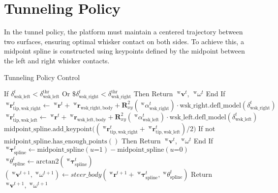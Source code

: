 \section{Tunneling Policy}

In the tunnel policy, the platform must maintain a centered trajectory between two surfaces, ensuring optimal whisker contact on both sides.
To achieve this, a midpoint spline is constructed using keypoints defined by the midpoint between the left and right whisker contacts.

\begin{algorithm}
    \caption{Tunneling Policy Control}
    \label{alg:tunneling_policy}
    \begin{algorithmic}
        \State If \(\delta_{\mathrm{wsk\_left}}^{t} < \delta_{\mathrm{wsk\_left}}^{\mathrm{thr}}\) Or \(\$\delta_{\mathrm{wsk\_right}}^{t} < \delta_{\mathrm{wsk\_right}}^{\mathrm{thr}}\) Then
        \State \quad Return \(\;^{\mathrm{w}}\boldsymbol{v}^{t}\), \(\;^{\mathrm{w}}\omega^{t}\)
        \State End If
        \State
        \State \(\;^{\mathrm{w}}\boldsymbol{r}_{\mathrm{tip, wsk\_right}}^{t} \gets \;^{\mathrm{w}}\boldsymbol{r}^{t} + \;^{\mathrm{w}}\boldsymbol{r}_{\mathrm{wsk\_right, body}} + \boldsymbol{R}_{xy}^{2}(\; ^{\mathrm{w}}\alpha_{\mathrm{wsk\_right}}^{t}) \cdot \mathrm{wsk\_right.defl\_model}(\delta_{\mathrm{wsk\_right}}^{t})\)
        \State \(\;^{\mathrm{w}}\boldsymbol{r}_{\mathrm{tip, wsk\_left}}^{t} \gets \;^{\mathrm{w}}\boldsymbol{r}^{t} + \;^{\mathrm{w}}\boldsymbol{r}_{\mathrm{wsk\_left, body}} + \boldsymbol{R}_{xy}^{2}(\; ^{\mathrm{w}}\alpha_{\mathrm{wsk\_left}}^{t}) \cdot \mathrm{wsk\_left.defl\_model}(\delta_{\mathrm{wsk\_left}}^{t})\)
        \State \(\mathrm{midpoint\_spline.add\_keypoint}\big((\;^{\mathrm{w}}\boldsymbol{r}_{\mathrm{tip, wsk\_right}}^{t} + \;^{\mathrm{w}}\boldsymbol{r}_{\mathrm{tip, wsk\_left}}^{t}) / 2\big)\)
        \State If not \(\mathrm{midpoint\_spline.has\_enough\_points()}\) Then
        \State \quad Return \(\;^{\mathrm{w}}\boldsymbol{v}^{t}\), \(\;^{\mathrm{w}}\omega^{t}\)
        \State End If
        \State
        \State \(\;^{\mathrm{w}}\boldsymbol{\tau}_{\mathrm{spline}}^{t} \gets \mathrm{midpoint\_spline}(u\mathord{=}1) - \mathrm{midpoint\_spline}(u\mathord{=}0)\)
        \State \(\;^{\mathrm{w}}\theta_{\mathrm{spline}}^{t} \gets \mathrm{arctan2}(\;^{\mathrm{w}}\boldsymbol{\tau}_{\mathrm{spline}}^{t})\)
        \State
        \State \((\;^{\mathrm{w}}\boldsymbol{v}^{t+1}, \;^{\mathrm{w}}\omega^{t+1}) \gets steer\_body(\;^{\mathrm{w}}\boldsymbol{r}^{t+1} + \;^{\mathrm{w}}\boldsymbol{\tau}_{\mathrm{spline}}^{t},\;^{\mathrm{w}}\theta_{\mathrm{spline}}^{t})\)
        \State Return \(\;^{\mathrm{w}}\boldsymbol{v}^{t+1}, \;^{\mathrm{w}}\omega^{t+1}\)
    \end{algorithmic}
\end{algorithm}



